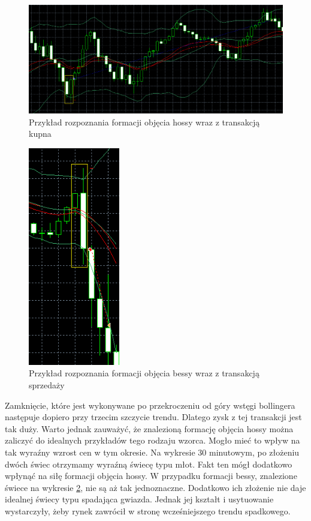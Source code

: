 \documentclass[pdflatex,11pt]{aghdpl}
\begin{document}
\begin{figure}[h!]
\begin{center}
\includegraphics[width=14cm]{bullishengulfing/przyklad.png}
\caption{Przykład rozpoznania formacji objęcia hossy wraz z transakcją kupna}
\label{przyklad_objecie_hossy}
\end{center}
\end{figure} 
\begin{figure}[h!]
\begin{center}
\includegraphics[width=4cm]{bearishengulfing/przyklad.png}
\caption{Przykład rozpoznania formacji objęcia bessy wraz z transakcją sprzedaży}
\label{przyklad_objecie_bessy}
\end{center}
\end{figure} 
Zamknięcie, które jest wykonywane po przekroczeniu od góry wstęgi bollingera następuje dopiero przy trzecim szczycie trendu. Dlatego zysk z tej transakcji jest tak duży. Warto jednak zauważyć, że znalezioną formację objęcia hossy można zaliczyć do idealnych przykładów tego rodzaju wzorca. Mogło mieć to wpływ na tak wyraźny wzrost cen w tym okresie. Na wykresie 30 minutowym, po złożeniu dwóch świec otrzymamy wyraźną świecę typu młot. Fakt ten mógł dodatkowo wpłynąć na siłę formacji objęcia hossy. W przypadku formacji bessy, znalezione świece na wykresie \ref{przyklad_objecie_bessy}, nie są aż tak jednoznaczne. Dodatkowo ich złożenie nie daje idealnej świecy typu spadająca gwiazda. Jednak jej kształt i usytuowanie wystarczyły, żeby rynek zawrócił w stronę wcześniejszego trendu spadkowego.
\end{document}
